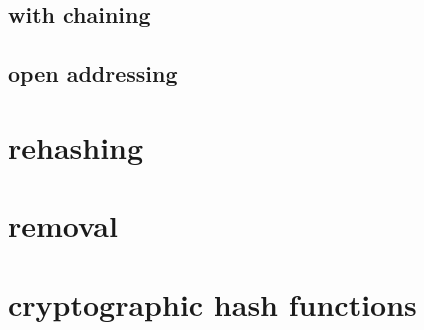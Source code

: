 \subsection{with chaining}

\subsection{open addressing}

\section{rehashing}

\section{removal}

\section{cryptographic hash functions}

